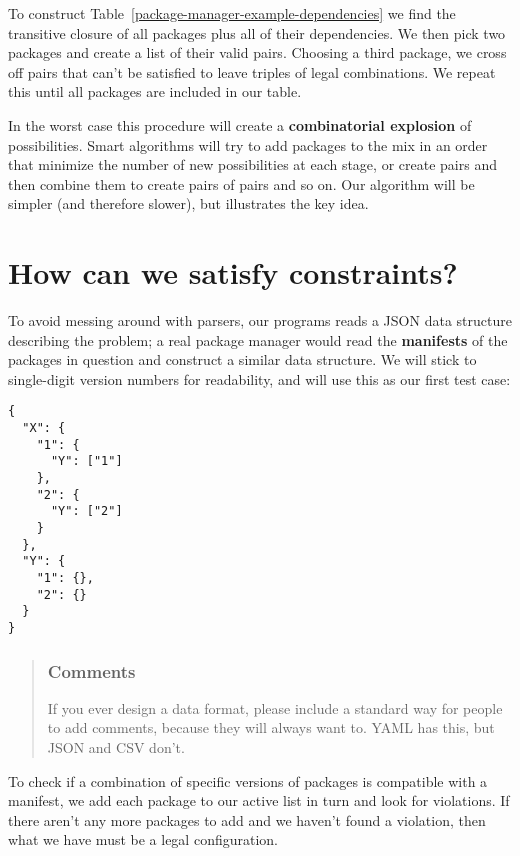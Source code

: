 \documentclass[krantzl]{krantz}
\newcommand{\tblref}[1]{Table~\ref{#1}}
\newcommand{\glossref}[1]{\textbf{#1}}
\newenvironment{callout}{\savenotes\begin{tBox}\begin{quotation}\toggletrue{inbox}\renewcommand{\thempfootnote}{\arabic{footnote}}}{\end{quotation}\vspace{\baselineskip}\end{tBox}\togglefalse{inbox}\spewnotes}
\begin{document}
To construct \tblref{package-manager-example-dependencies}
we find the transitive closure of all packages plus all of their dependencies.
We then pick two packages and create a list of their valid pairs.
Choosing a third package,
we cross off pairs that can’t be satisfied
to leave triples of legal combinations.
We repeat this until all packages are included in our table.


In the worst case this procedure will create
a \glossref{combinatorial explosion} of possibilities.
Smart algorithms will try to add packages to the mix
in an order that minimize the number of new possibilities at each stage,
or create pairs and then combine them to create pairs of pairs and so on.
Our algorithm will be simpler (and therefore slower),
but illustrates the key idea.

\section{How can we satisfy constraints?}\label{package-manager-constraints}


To avoid messing around with parsers,
our programs reads a JSON data structure describing the problem;
a real package manager would read the \glossref{manifests} of the packages in question
and construct a similar data structure.
We will stick to single-digit version numbers for readability,
and will use this as our first test case:


\begin{lstlisting}[frame=tblr]
{
  "X": {
    "1": {
      "Y": ["1"]
    },
    "2": {
      "Y": ["2"]
    }
  },
  "Y": {
    "1": {},
    "2": {}
  }
}
\end{lstlisting}


\begin{callout}


\subsubsection*{Comments}


If you ever design a data format,
please include a standard way for people to add comments,
because they will always want to.
YAML has this,
but JSON and CSV don’t.

\end{callout}


To check if a combination of specific versions of packages is compatible with a manifest,
we add each package to our active list in turn and look for violations.
If there aren’t any more packages to add and we haven’t found a violation,
then what we have must be a legal configuration.
\end{document}

